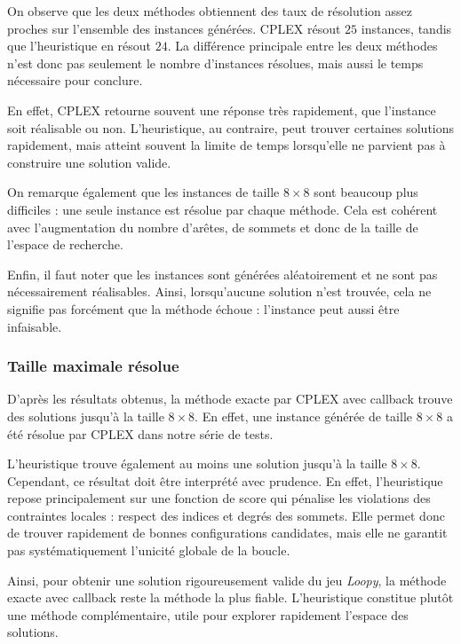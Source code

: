 On observe que les deux méthodes obtiennent des taux de résolution assez proches sur l'ensemble des instances générées. CPLEX résout \(25\) instances, tandis que l'heuristique en résout \(24\). La différence principale entre les deux méthodes n'est donc pas seulement le nombre d'instances résolues, mais aussi le temps nécessaire pour conclure.

En effet, CPLEX retourne souvent une réponse très rapidement, que l'instance soit réalisable ou non. L'heuristique, au contraire, peut trouver certaines solutions rapidement, mais atteint souvent la limite de temps lorsqu'elle ne parvient pas à construire une solution valide.

On remarque également que les instances de taille \(8 \times 8\) sont beaucoup plus difficiles : une seule instance est résolue par chaque méthode. Cela est cohérent avec l'augmentation du nombre d'arêtes, de sommets et donc de la taille de l'espace de recherche.

Enfin, il faut noter que les instances sont générées aléatoirement et ne sont pas nécessairement réalisables. Ainsi, lorsqu'aucune solution n'est trouvée, cela ne signifie pas forcément que la méthode échoue : l'instance peut aussi être infaisable.

\subsubsection{Taille maximale résolue}

D'après les résultats obtenus, la méthode exacte par CPLEX avec callback trouve des solutions jusqu'à la taille \(8 \times 8\). En effet, une instance générée de taille \(8 \times 8\) a été résolue par CPLEX dans notre série de tests.

L'heuristique trouve également au moins une solution jusqu'à la taille \(8 \times 8\). Cependant, ce résultat doit être interprété avec prudence. En effet, l'heuristique repose principalement sur une fonction de score qui pénalise les violations des contraintes locales : respect des indices et degrés des sommets. Elle permet donc de trouver rapidement de bonnes configurations candidates, mais elle ne garantit pas systématiquement l'unicité globale de la boucle.

Ainsi, pour obtenir une solution rigoureusement valide du jeu \textit{Loopy}, la méthode exacte avec callback reste la méthode la plus fiable. L'heuristique constitue plutôt une méthode complémentaire, utile pour explorer rapidement l'espace des solutions.

